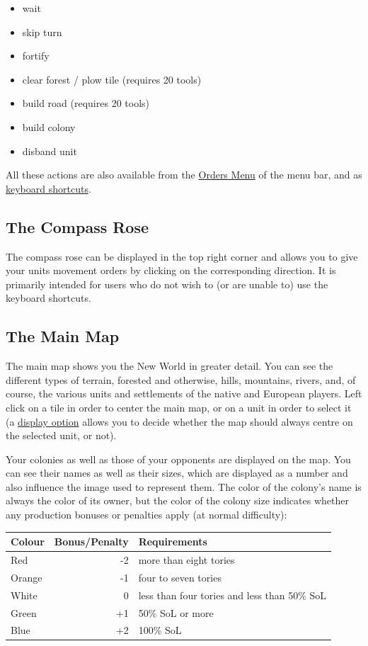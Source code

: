 \documentclass[12pt]{book}
\begin{document}
\begin{itemize}
\item wait
\item skip turn
\item fortify
\item clear forest / plow tile (requires 20 tools)
\item build road (requires 20 tools)
\item build colony
\item disband unit
\end{itemize}

All these actions are also available from the \hyperlink{orders
menu}{Orders Menu} of the menu bar, and as \hyperlink{keyboard
shortcuts}{keyboard shortcuts}.


\hypertarget{compass rose}{\subsection{The Compass Rose}}

The compass rose can be displayed in the top right corner and allows
you to give your units movement orders by clicking on the corresponding
direction. It is primarily intended for users who do not wish to (or
are unable to) use the keyboard shortcuts.


\hypertarget{main map}{\subsection{The Main Map}}

The main map shows you the New World in greater detail. You can see
the different types of terrain, forested and otherwise, hills,
mountains, rivers, and, of course, the various units and settlements
of the native and European players. Left click on a tile in order to
center the main map, or on a unit in order to select it (a
\hyperlink{display options}{display option} allows you to decide
whether the map should always centre on the selected unit, or
not). 

Your colonies as well as those of your opponents are displayed on the
map. You can see their names as well as their sizes, which are
displayed as a number and also influence the image used to represent
them. The color of the colony's name is always the color of its owner,
but the color of the colony size indicates whether any production
bonuses or penalties apply (at normal difficulty):

\vskip5mm

\begin{tabular}{l r l}
Colour&Bonus/Penalty&Requirements\\
\hline
Red    & -2 & more than eight tories\\
Orange & -1 & four to seven tories\\
White  &  0 & less than four tories and less than 50\% SoL\\
Green  & +1 & 50\% SoL or more\\
Blue   & +2 & 100\% SoL\\
\end{tabular}
\end{document}
